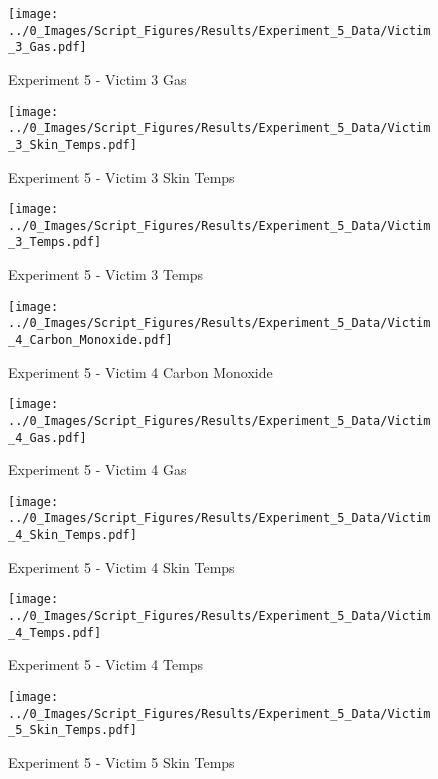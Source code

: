 	\clearpage

	\begin{figure}[H]
		\centering
		\texttt{[image: ../0\_Images/Script\_Figures/Results/Experiment\_5\_Data/Victim\_3\_Gas.pdf]}
		\caption[]{Experiment 5 - Victim 3 Gas}
	\end{figure}
 

	\begin{figure}[H]
		\centering
		\texttt{[image: ../0\_Images/Script\_Figures/Results/Experiment\_5\_Data/Victim\_3\_Skin\_Temps.pdf]}
		\caption[]{Experiment 5 - Victim 3 Skin Temps}
	\end{figure}
 
	\clearpage

	\begin{figure}[H]
		\centering
		\texttt{[image: ../0\_Images/Script\_Figures/Results/Experiment\_5\_Data/Victim\_3\_Temps.pdf]}
		\caption[]{Experiment 5 - Victim 3 Temps}
	\end{figure}
 

	\begin{figure}[H]
		\centering
		\texttt{[image: ../0\_Images/Script\_Figures/Results/Experiment\_5\_Data/Victim\_4\_Carbon\_Monoxide.pdf]}
		\caption[]{Experiment 5 - Victim 4 Carbon Monoxide}
	\end{figure}
 
	\clearpage

	\begin{figure}[H]
		\centering
		\texttt{[image: ../0\_Images/Script\_Figures/Results/Experiment\_5\_Data/Victim\_4\_Gas.pdf]}
		\caption[]{Experiment 5 - Victim 4 Gas}
	\end{figure}
 

	\begin{figure}[H]
		\centering
		\texttt{[image: ../0\_Images/Script\_Figures/Results/Experiment\_5\_Data/Victim\_4\_Skin\_Temps.pdf]}
		\caption[]{Experiment 5 - Victim 4 Skin Temps}
	\end{figure}
 
	\clearpage

	\begin{figure}[H]
		\centering
		\texttt{[image: ../0\_Images/Script\_Figures/Results/Experiment\_5\_Data/Victim\_4\_Temps.pdf]}
		\caption[]{Experiment 5 - Victim 4 Temps}
	\end{figure}
 

	\begin{figure}[H]
		\centering
		\texttt{[image: ../0\_Images/Script\_Figures/Results/Experiment\_5\_Data/Victim\_5\_Skin\_Temps.pdf]}
		\caption[]{Experiment 5 - Victim 5 Skin Temps}
	\end{figure}
 
